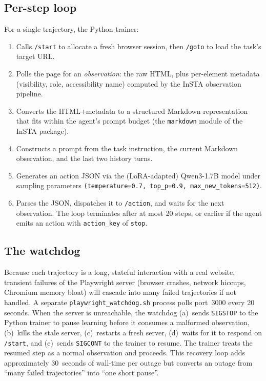 \documentclass[12pt,a4paper]{report}
\begin{document}
\subsection*{Per-step loop}

For a single trajectory, the Python trainer:
\begin{enumerate}
  \item Calls \texttt{/start} to allocate a fresh browser session, then \texttt{/goto} to load the task's target URL.
  \item Polls the page for an \emph{observation}: the raw HTML, plus per-element metadata (visibility, role, accessibility name) computed by the InSTA observation pipeline.
  \item Converts the HTML+metadata to a structured Markdown representation that fits within the agent's prompt budget (the \texttt{markdown} module of the InSTA package).
  \item Constructs a prompt from the task instruction, the current Markdown observation, and the last two history turns.
  \item Generates an action JSON via the (LoRA-adapted) Qwen3-1.7B model under sampling parameters \texttt{(temperature=0.7, top\_p=0.9, max\_new\_tokens=512)}.
  \item Parses the JSON, dispatches it to \texttt{/action}, and waits for the next observation. The loop terminates after at most 20 steps, or earlier if the agent emits an action with \texttt{action\_key} of \texttt{stop}.
\end{enumerate}

\subsection*{The watchdog}

Because each trajectory is a long, stateful interaction with a real website, transient failures of the Playwright server (browser crashes, network hiccups, Chromium memory bloat) will cascade into many failed trajectories if not handled. A separate \texttt{playwright\_watchdog.sh} process polls port~3000 every 20 seconds. When the server is unreachable, the watchdog (a)~sends \texttt{SIGSTOP} to the Python trainer to pause learning before it consumes a malformed observation, (b)~kills the stale server, (c)~restarts a fresh server, (d)~waits for it to respond on \texttt{/start}, and (e)~sends \texttt{SIGCONT} to the trainer to resume. The trainer treats the resumed step as a normal observation and proceeds. This recovery loop adds approximately 30~seconds of wall-time per outage but converts an outage from ``many failed trajectories'' into ``one short pause''.
\end{document}
